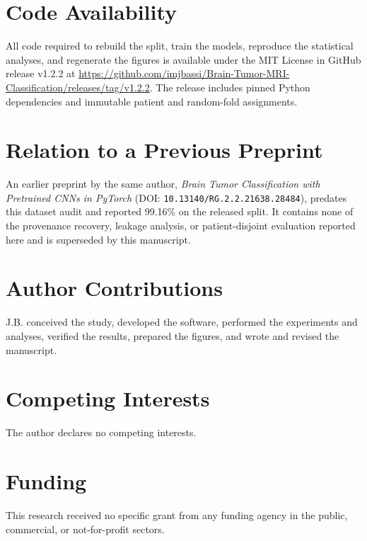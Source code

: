 ﻿\documentclass[twocolumn]{article}
\begin{document}
\section*{Code Availability}
All code required to rebuild the split, train the models, reproduce the statistical analyses, and regenerate the figures is available under the MIT License in GitHub release v1.2.2 at \url{https://github.com/imjbassi/Brain-Tumor-MRI-Classification/releases/tag/v1.2.2}. The release includes pinned Python dependencies and immutable patient and random-fold assignments.

\section*{Relation to a Previous Preprint}
An earlier preprint by the same author, \textit{Brain Tumor Classification with Pretrained CNNs in PyTorch} (DOI: \texttt{10.13140/RG.2.2.21638.28484}), predates this dataset audit and reported 99.16\% on the released split. It contains none of the provenance recovery, leakage analysis, or patient-disjoint evaluation reported here and is superseded by this manuscript.

\section*{Author Contributions}
J.B. conceived the study, developed the software, performed the experiments and analyses, verified the results, prepared the figures, and wrote and revised the manuscript.

\section*{Competing Interests}
The author declares no competing interests.

\section*{Funding}
This research received no specific grant from any funding agency in the public, commercial, or not-for-profit sectors.
\end{document}
